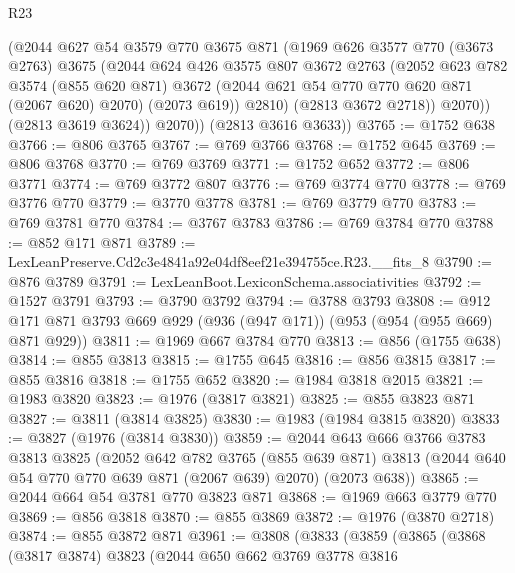 \begin{lexlean}{R23}
\begin{coremodule}
              (@2044
                @627
                @54
                @3579
                @770
                @3675
                @871
                (@1969
                  @626
                  @3577
                  @770
                  (@3673 @2763)
                  @3675
                  (@2044
                    @624
                    @426
                    @3575
                    @807
                    @3672
                    @2763
                    (@2052
                      @623
                      @782
                      @3574
                      (@855 @620 @871)
                      @3672
                      (@2044 @621 @54 @770 @770 @620 @871 (@2067 @620) @2070)
                      (@2073 @619))
                    @2810)
                  (@2813 @3672 @2718))
                @2070))
            (@2813 @3619 @3624))
          @2070))
      (@2813 @3616 @3633))
@3765 := @1752 @638
@3766 := @806 @3765
@3767 := @769 @3766
@3768 := @1752 @645
@3769 := @806 @3768
@3770 := @769 @3769
@3771 := @1752 @652
@3772 := @806 @3771
@3774 := @769 @3772 @807
@3776 := @769 @3774 @770
@3778 := @769 @3776 @770
@3779 := @3770 @3778
@3781 := @769 @3779 @770
@3783 := @769 @3781 @770
@3784 := @3767 @3783
@3786 := @769 @3784 @770
@3788 := @852 @171 @871
@3789 := LexLeanPreserve.Cd2c3e4841a92e04df8eef21e394755ce.R23.__fits_8
@3790 := @876 @3789
@3791 := LexLeanBoot.LexiconSchema.associativities
@3792 := @1527 @3791
@3793 := @3790 @3792
@3794 := @3788 @3793
@3808 := @912 @171 @871 @3793 @669 @929 (@936 (@947 @171)) (@953 (@954 (@955 @669) @871 @929))
@3811 := @1969 @667 @3784 @770
@3813 := @856 (@1755 @638)
@3814 := @855 @3813
@3815 := @1755 @645
@3816 := @856 @3815
@3817 := @855 @3816
@3818 := @1755 @652
@3820 := @1984 @3818 @2015
@3821 := @1983 @3820
@3823 := @1976 (@3817 @3821)
@3825 := @855 @3823 @871
@3827 := @3811 (@3814 @3825)
@3830 := @1983 (@1984 @3815 @3820)
@3833 := @3827 (@1976 (@3814 @3830))
@3859 := @2044
    @643
    @666
    @3766
    @3783
    @3813
    @3825
    (@2052
      @642
      @782
      @3765
      (@855 @639 @871)
      @3813
      (@2044 @640 @54 @770 @770 @639 @871 (@2067 @639) @2070)
      (@2073 @638))
@3865 := @2044 @664 @54 @3781 @770 @3823 @871
@3868 := @1969 @663 @3779 @770
@3869 := @856 @3818
@3870 := @855 @3869
@3872 := @1976 (@3870 @2718)
@3874 := @855 @3872 @871
@3961 := @3808
    (@3833
      (@3859
        (@3865
          (@3868
            (@3817 @3874)
            @3823
            (@2044
              @650
              @662
              @3769
              @3778
              @3816

\end{coremodule}
\end{lexlean}
